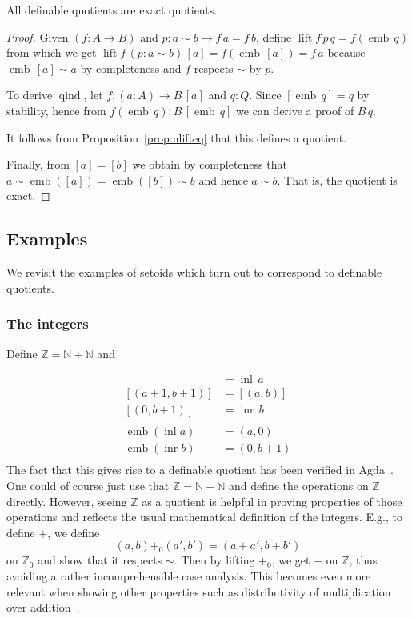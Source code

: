 \documentclass[envcountsame]{llncs}
\newcommand{\N}{\mathbb{N}}
\newcommand{\Z}{\mathbb{Z}}
\providecommand{\class}[1]{[#1]}
\DeclareMathOperator{\qind}{qind}
\DeclareMathOperator{\emb}{emb}
\DeclareMathOperator{\inl}{inl}
\DeclareMathOperator{\inr}{inr}
\DeclareMathOperator{\lift}{lift}
\renewcommand{\equiv}{=}
\begin{document}
\begin{proposition}\label{prop:definableimpliesexact}
All definable quotients are exact quotients.
\end{proposition}
\begin{proof}

Given $(f\colon A \to B)$ and $p : a\sim b \to f\,a \equiv f\,b$, define $\lift f\, p \,q = f (\emb\,q)$ from which we get $\lift f \,(p : a \sim b)\,\class a\equiv f(\emb\,\class a)\equiv f\,a$ because $\emb\,\class a\sim a$ by completeness and $f$ respects $\sim$ by $p$.

To derive $\qind$, let $f:(a\colon A)\to B\,\class a$ and $q:Q$. Since $ \class{\emb\,q} \equiv q$ by stability, hence from $f (\emb\,q):B\,\class{\emb\,q}$ we can derive a proof of $B\,q$.

It follows from Proposition~\ref{prop:nlifteq} that this defines a quotient.

Finally, from $\class a \equiv \class b$
we obtain by completeness that $a\sim\emb(\class a)\equiv\emb(\class b)\sim b$ and hence $a\sim b$. That is, the quotient is exact.
\end{proof}


\subsection{Examples}\label{sec:dquotients:examples}

We revisit the examples of setoids which turn out to correspond to
definable quotients.

\subsubsection*{The integers}
Define $\Z =\N + \N $ and

\begin{align*}
\class{(a,0)} &= \inl\,a\\
\class{(a+1,b+1)} &= \class{(a,b)}\\
\class{(0,b+1)} &= \inr\,b\\\\
\emb (\inl a) &= (a,0)\\
\emb (\inr b) &= (0,b+1)\\
\end{align*}
The fact that this gives rise to a definable quotient has been verified in Agda~\cite{nuo2010report}.
 One could of course just use that $\Z=\N + \N$ and define the operations on $\Z$ directly. However, seeing  $\Z$ as a quotient is helpful in proving properties of those operations and reflects the usual mathematical definition of the integers. E.g., to define $+$, we define
\[(a,b){+_0}(a', b')= (a+a',b+b')\]
on $\Z_0$ and show that it respects $\sim$. Then by lifting $+_0$, we get $+$ on $\Z$, thus avoiding a rather incomprehensible case analysis. This becomes even more relevant when showing other properties such as distributivity of multiplication over addition~\cite{nuo2010report}.
\end{document}
